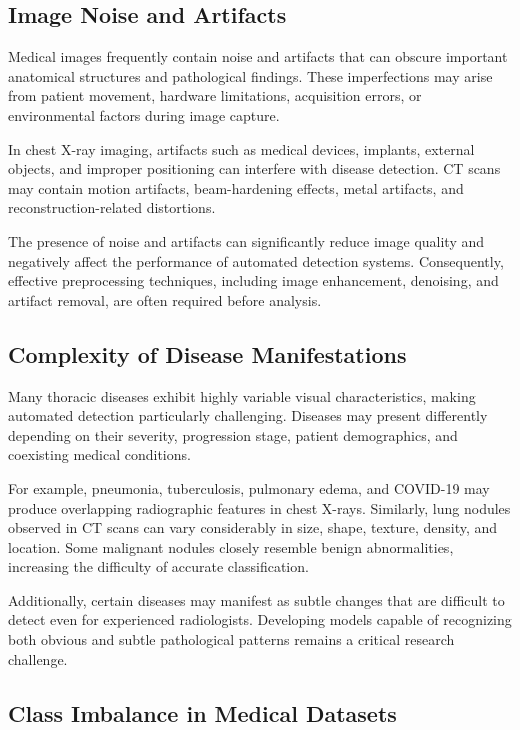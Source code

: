 \subsection{Image Noise and Artifacts}

Medical images frequently contain noise and artifacts that can obscure important anatomical structures and pathological findings. These imperfections may arise from patient movement, hardware limitations, acquisition errors, or environmental factors during image capture.

In chest X-ray imaging, artifacts such as medical devices, implants, external objects, and improper positioning can interfere with disease detection. CT scans may contain motion artifacts, beam-hardening effects, metal artifacts, and reconstruction-related distortions.

The presence of noise and artifacts can significantly reduce image quality and negatively affect the performance of automated detection systems. Consequently, effective preprocessing techniques, including image enhancement, denoising, and artifact removal, are often required before analysis.

\subsection{Complexity of Disease Manifestations}

Many thoracic diseases exhibit highly variable visual characteristics, making automated detection particularly challenging. Diseases may present differently depending on their severity, progression stage, patient demographics, and coexisting medical conditions.

For example, pneumonia, tuberculosis, pulmonary edema, and COVID-19 may produce overlapping radiographic features in chest X-rays. Similarly, lung nodules observed in CT scans can vary considerably in size, shape, texture, density, and location. Some malignant nodules closely resemble benign abnormalities, increasing the difficulty of accurate classification.

Additionally, certain diseases may manifest as subtle changes that are difficult to detect even for experienced radiologists. Developing models capable of recognizing both obvious and subtle pathological patterns remains a critical research challenge.

\subsection{Class Imbalance in Medical Datasets}

